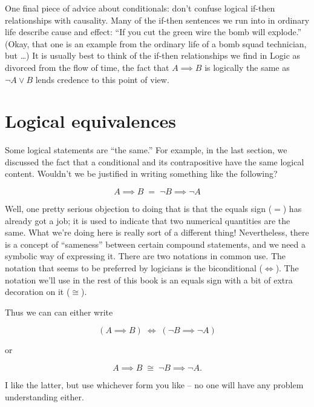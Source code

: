 One final piece of advice about conditionals: don't confuse logical
if-then relationships with causality.  Many of the if-then sentences
we run into in ordinary life describe cause and effect:  
``If you cut the green wire the bomb will explode.''  (Okay, that one
is an example from the ordinary life of a bomb squad technician, but \ldots)
It is usually best to think of the if-then relationships we find in
Logic as divorced from the flow of time, the fact that $A \implies B$
is logically the same as ${\lnot}A \lor B$ lends credence to this point of view.

\newpage




\newpage

\section{Logical equivalences}
\label{sec:le}

Some logical statements are ``the same.''  For example, in the last
section, we discussed the fact that a conditional
and its contrapositive have the same logical content.  Wouldn't
we be justified in writing something like the following?

\[ A \implies B \; = \; {\lnot}B \implies {\lnot}A \]

Well, one pretty serious objection to doing that is that the 
equals sign ($=$) has already got a job; it is used to indicate that
two numerical quantities are the same.  What we're doing here is 
really sort of a different thing!  Nevertheless, there is a concept
of ``sameness'' between certain compound statements, and we need a 
symbolic way of expressing it.  There are two notations in common 
use.  The notation that seems to be preferred by logicians is the
biconditional ($\iff$).  The notation we'll use
in the rest of this book is an equals sign with a bit of extra decoration
on it ($\cong$).  

Thus we can can either write 

\[ (A \implies B) \; \iff \; ({\lnot}B \implies {\lnot}A) \]

\noindent or 

\[ A \implies B \; \cong \; {\lnot}B \implies {\lnot}A. \]

\noindent I like the latter, but use whichever form you like -- no one
will have any problem understanding either.

